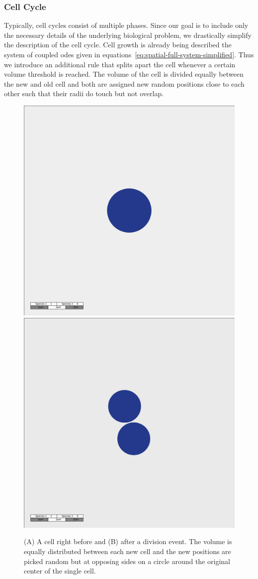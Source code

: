 \documentclass[10pt,A4paper]{article}
\numberwithin{equation}{section}
\begin{document}
\subsubsection{Cell Cycle}
Typically, cell cycles consist of multiple phases.
Since our goal is to include only the necessary details of the underlying biological problem, we drastically simplify the description of the cell cycle.
Cell growth is already being described the system of coupled \acp{ode} given in equations~\eqref{eq:spatial-full-system-simplified}.
Thus we introduce an additional rule that splits apart the cell whenever a certain volume threshold is reached.
The volume of the cell is divided equally between the new and old cell and both are assigned new random positions close to each other such that their radii do touch but not overlap.
\begin{figure}
    \begin{center}
    \includegraphics[width=0.49\columnwidth]{Figures/snapshot-2-cells-before-division.png}%
    \hspace{0.01\columnwidth}%
    \includegraphics[width=0.49\columnwidth]{Figures/snapshot-2-cells-after-division.png}
    \caption{
        (A) A cell right before and (B) after a division event.
        The volume is equally distributed between each new cell and the new positions are picked random but at opposing sides on a circle around the original center of the single cell.
    }
    \end{center}
\end{figure}
\end{document}
